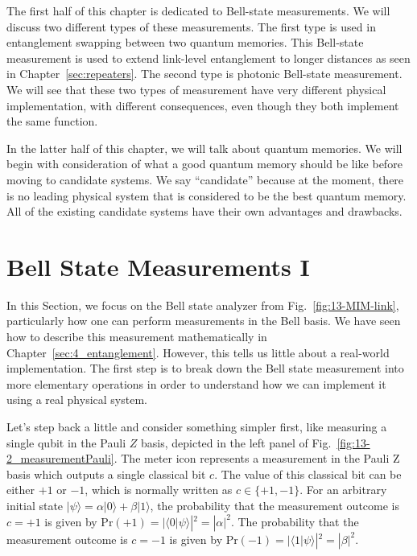The first half of this chapter is dedicated to Bell-state measurements.
We will discuss two different types of these measurements.
The first type is used in entanglement swapping between two quantum memories.
This Bell-state measurement is used to extend link-level entanglement to longer distances as seen in Chapter~\ref{sec:repeaters}.
The second type is photonic Bell-state measurement.
We will see that these two types of measurement have very different physical implementation, with different consequences, even though they both implement the same function.

In the latter half of this chapter, we will talk about quantum memories.
We will begin with consideration of what a good quantum memory should be like before moving to candidate systems.
We say ``candidate'' because at the moment, there is no leading physical system that is considered to be the best quantum memory. All of the existing candidate systems have their own advantages and drawbacks.


\section{Bell State Measurements I}
\label{sec:bell-state-measurements-I}

In this Section, we focus on the Bell state analyzer from Fig.~\ref{fig:13-MIM-link}, particularly how one can perform measurements in the Bell basis.
We have seen how to describe this measurement mathematically in Chapter~\ref{sec:4_entanglement}.
However, this tells us little about a real-world implementation.
The first step is to break down the Bell state measurement into more elementary operations in order to understand how we can implement it using a real physical system.

Let's step back a little and consider something simpler first, like measuring a single qubit in the Pauli $Z$ basis, depicted in the left panel of Fig.~\ref{fig:13-2_measurementPauli}.
The meter icon represents a measurement in the Pauli Z basis which outputs a single classical bit $c$.
The value of this classical bit can be either $+1$ or $-1$, which is normally written as $c\in\{+1,-1\}$.
For an arbitrary initial state $|\psi\rangle = \alpha |0\rangle + \beta |1\rangle$, the probability that the measurement outcome is $c=+1$ is given by $\text{Pr}(+1)=|\langle0|\psi\rangle|^2=|\alpha|^2$.
The probability that the measurement outcome is $c=-1$ is given by $\text{Pr}(-1)=|\langle1|\psi\rangle|^2=|\beta|^2$.

